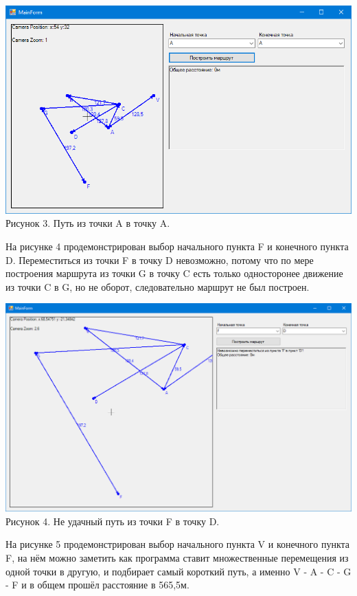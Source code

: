 \documentclass[a4paper,14pt, Times New Roman]{extarticle}
\begin{document}
\begin{center}
\includegraphics[width=1\textwidth]{atoa}
Рисунок 3. Путь из точки A в точку A.
\end{center}

На рисунке 4 продемонстрирован выбор начального пункта F и конечного пункта D. Переместиться из точки F в точку D невозможно, потому что по мере построения маршрута из точки G в точку C есть только односторонее движение из точки C в G, но не оборот, следовательно маршрут не был построен.

\begin{center}
\includegraphics[width=1\textwidth]{atod}
Рисунок 4. Не удачный путь из точки F в точку D.
\end{center}


На рисунке 5 продемонстрирован выбор начального пункта V и конечного пункта F, на нём можно заметить как программа ставит множественные перемещения из одной точки в другую, и подбирает самый короткий путь, а именно V - A - C - G - F и в общем прошёл расстояние в 565,5м.
\end{document}
